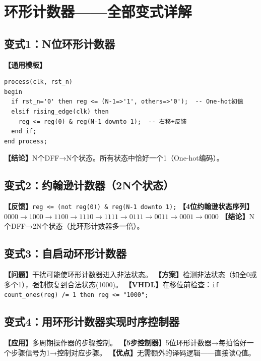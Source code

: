 \chapter{环形计数器——全部变式详解}

\section{变式1：N位环形计数器}

\begin{detailbox}[完整教学]
\textbf{【通用模板】}
\begin{lstlisting}
process(clk, rst_n)
begin
  if rst_n='0' then reg <= (N-1=>'1', others=>'0');  -- One-hot初值
  elsif rising_edge(clk) then
    reg <= reg(0) & reg(N-1 downto 1);  -- 右移+反馈
  end if;
end process;
\end{lstlisting}
\textbf{【结论】}N个DFF→N个状态。所有状态中恰好一个1（One-hot编码）。
\end{detailbox}


\section{变式2：约翰逊计数器（2N个状态）}

\begin{detailbox}[完整教学]
\textbf{【反馈】}\texttt{reg <= (not reg(0)) \& reg(N-1 downto 1);}
\textbf{【4位约翰逊状态序列】}$0000\to1000\to1100\to1110\to1111\to0111\to0011\to0001\to0000$
\textbf{【结论】}N个DFF→2N个状态（比环形计数器多一倍）。
\end{detailbox}


\section{变式3：自启动环形计数器}

\begin{detailbox}[完整教学]
\textbf{【问题】}干扰可能使环形计数器进入非法状态。
\textbf{【方案】}检测非法状态（如全0或多个1），强制恢复到合法状态(1000)。
\textbf{【VHDL】}在移位前检查：\texttt{if count\_ones(reg) /= 1 then reg <= "1000";}
\end{detailbox}


\section{变式4：用环形计数器实现时序控制器}

\begin{detailbox}[完整教学]
\textbf{【应用】}多周期操作器的步骤控制。
\textbf{【5步控制器】}5位环形计数器→每拍恰好一个步骤信号为1→控制对应步骤。
\textbf{【优点】}无需额外的译码逻辑——直接读Q值。
\end{detailbox}
